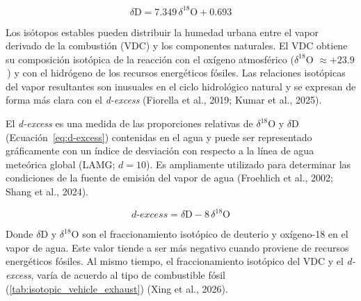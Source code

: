 \begin{equation}
\delta\mathrm{D} = 7.349\,\delta^{18}\mathrm{O} + 0.693
\label{eq:lml}
\end{equation}

Los isótopos estables pueden distribuir la humedad urbana entre el
vapor derivado de la combustión (VDC) y los componentes naturales. El
VDC obtiene su composición isotópica de la reacción con el oxígeno
atmosférico ($\delta^{18}$O $\approx +23.9$\,\textperthousand) y con el
hidrógeno de los recursos energéticos fósiles. Las relaciones isotópicas del
vapor resultantes son inusuales en el ciclo hidrológico natural y se
expresan de forma más clara con el \textit{d-excess}
(Fiorella et al., 2019; Kumar et al., 2025).

El \textit{d-excess} es una medida de las proporciones relativas de
$\delta^{18}$O y $\delta$D (Ecuación~\ref{eq:d-excess}) contenidas en
el agua y puede ser representado gráficamente con un índice de
desviación con respecto a la línea de agua meteórica global (LAMG; $d=10$). Es
ampliamente utilizado para determinar las condiciones de la fuente de
emisión del vapor de agua (Froehlich et al., 2002; Shang et al., 2024). 

\begin{equation}
\textit{d-excess} = \delta\mathrm{D} - 8\,\delta^{18}\mathrm{O}
\label{eq:d-excess}
\end{equation}

Donde $\delta$D y $\delta^{18}$O son el fraccionamiento isotópico de deuterio y
oxígeno-18 en el vapor de agua. Este valor tiende a ser más negativo 
cuando proviene de recursos energéticos fósiles. Al mismo tiempo, el 
fraccionamiento isotópico del VDC y el \textit{d-excess}, varía 
de acuerdo al tipo de combustible fósil (\ref{tab:isotopic_vehicle_exhaust})
(Xing et al., 2026).

